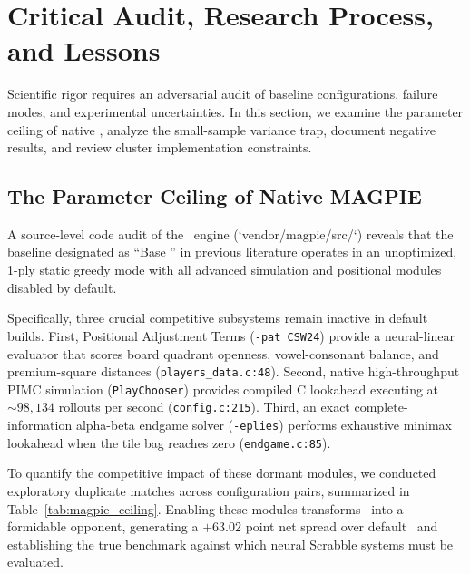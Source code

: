 \section{Critical Audit, Research Process, and Lessons}
\label{sec:critical_audit}

Scientific rigor requires an adversarial audit of baseline configurations, failure modes, and experimental uncertainties. In this section, we examine the parameter ceiling of native \magpie, analyze the small-sample variance trap, document negative results, and review cluster implementation constraints.

\subsection{The Parameter Ceiling of Native MAGPIE}

A source-level code audit of the \magpie\ engine (`vendor/magpie/src/`) reveals that the baseline designated as ``Base \magpie'' in previous literature operates in an unoptimized, 1-ply static greedy mode with all advanced simulation and positional modules disabled by default. 

Specifically, three crucial competitive subsystems remain inactive in default builds. First, Positional Adjustment Terms (\texttt{-pat CSW24}) provide a neural-linear evaluator that scores board quadrant openness, vowel-consonant balance, and premium-square distances (\texttt{players\_data.c:48}). Second, native high-throughput PIMC simulation (\texttt{PlayChooser}) provides compiled C lookahead executing at $\sim 98,134$ rollouts per second (\texttt{config.c:215}). Third, an exact complete-information alpha-beta endgame solver (\texttt{-eplies}) performs exhaustive minimax lookahead when the tile bag reaches zero (\texttt{endgame.c:85}).

To quantify the competitive impact of these dormant modules, we conducted exploratory duplicate matches across configuration pairs, summarized in Table~\ref{tab:magpie_ceiling}. Enabling these modules transforms \magpie\ into a formidable opponent, generating a $+63.02$ point net spread over default \magpie\ and establishing the true benchmark against which neural Scrabble systems must be evaluated.

